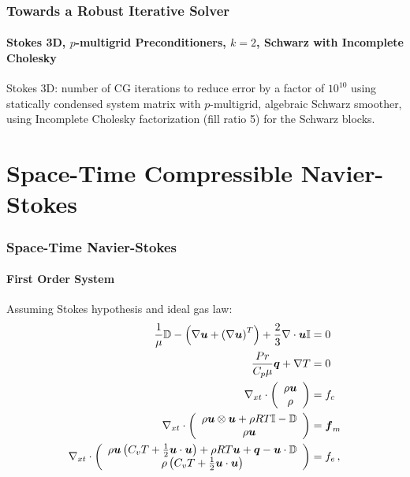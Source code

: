 \documentclass[18pt,xcolor=table]{beamer}
\begin{document}
\begin{frame}
\frametitle{Towards a Robust Iterative Solver}
\framesubtitle{Stokes 3D, $p$-multigrid Preconditioners, $k=2$, Schwarz with Incomplete Cholesky}  %
  \begin{figure}[ht]
  \centering
  \label{fig:Stokes3Dk2GMGIC}
  \end{figure}
  \vspace{-5mm}
  Stokes 3D: number of CG iterations to reduce error by a factor of $10^{10}$ using statically condensed system matrix with $p$-multigrid, algebraic Schwarz smoother, using Incomplete Cholesky factorization (fill ratio 5) for the Schwarz blocks.
\end{frame}


\section{Space-Time Compressible Navier-Stokes}
\begin{frame}[t]
\frametitle{Space-Time Navier-Stokes}
\framesubtitle{First Order System}
Assuming Stokes hypothesis and ideal gas law:
\begin{align*}
  \frac{1}{\mu}\mathbb{D}-\left( \nabla\boldsymbol u+\left( \nabla\boldsymbol u \right)^T \right)+\frac{2}{3}\nabla\cdot\boldsymbol u\mathbb{I}&=0\\
  \frac{Pr}{C_p\mu}\boldsymbol q+\nabla T&=0\\
  \nabla_{xt}\cdot\left( \begin{array}{c} \rho\boldsymbol u\\ \rho\\ \end{array} \right)&=f_c\\
  \nabla_{xt}\cdot\left( \begin{array}{c} \rho\boldsymbol u\otimes\boldsymbol u+\rho RT\mathbb{I}-\mathbb{D}\\ \rho\boldsymbol u\\ \end{array} \right)&=\boldsymbol f_m\\
  \nabla_{xt}\cdot\left( \begin{array}{c} \rho\boldsymbol u\left( C_v T+\frac{1}{2}\boldsymbol u\cdot\boldsymbol u \right)+\rho RT\boldsymbol u+\boldsymbol q-\boldsymbol u\cdot\mathbb{D}\\ \rho\left( C_v T+\frac{1}{2}\boldsymbol u\cdot\boldsymbol u \right)\\ \end{array} \right)&=f_e\,,
\end{align*}
\end{frame}
\end{document}

